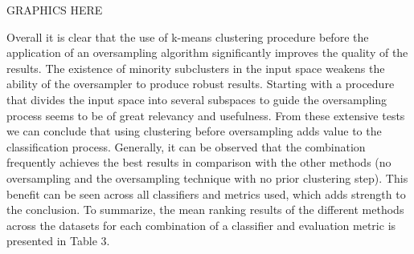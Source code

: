 \documentclass[parskip=full]{scrartcl}
\begin{document}
GRAPHICS HERE

Overall it is clear that the use of k-means clustering procedure before the 
application of an oversampling algorithm significantly improves the quality of 
the results. The existence of minority subclusters in the input space weakens 
the ability of the oversampler to produce robust results. Starting with a 
procedure that divides the input space into several subspaces to guide the 
oversampling process seems to be of great relevancy and usefulness. From these 
extensive tests we can conclude that using clustering before oversampling adds 
value to the classification process. Generally, it can be observed that the 
combination frequently achieves the best results in comparison with the other 
methods (no oversampling and the oversampling technique with no prior 
clustering step). This benefit can be seen across all classifiers and metrics 
used, which adds strength to the conclusion. To summarize, the mean ranking 
results of the different methods across the datasets for each combination of a 
classifier and evaluation metric is presented in Table 3.



\end{document}
